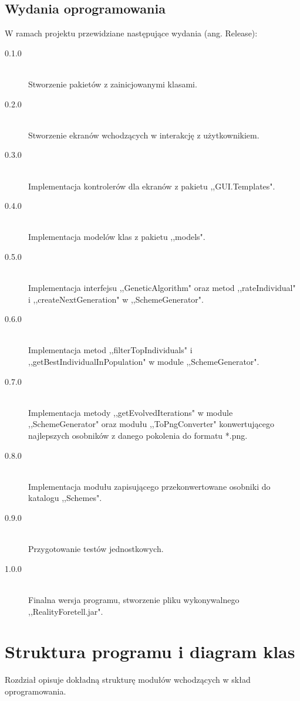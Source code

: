 \documentclass[10pt,oneside]{article}
\begin{document}
	\subsection{Wydania oprogramowania}
	W ramach projektu przewidziane następujące wydania (ang. Release):
	\begin{description}
		\item[0.1.0] \hfill \\Stworzenie pakietów z zainicjowanymi klasami.
		\item[0.2.0] \hfill \\Stworzenie ekranów wchodzących w interakcję z użytkownikiem.
		\item[0.3.0] \hfill \\Implementacja kontrolerów dla ekranów z pakietu ,,GUI.Templates".
		\item[0.4.0] \hfill \\Implementacja modelów klas z pakietu ,,models".
		\item[0.5.0] \hfill \\Implementacja interfejsu ,,GeneticAlgorithm" oraz metod ,,rateIndividual" i ,,createNextGeneration" w ,,SchemeGenerator".
		\item[0.6.0] \hfill \\Implementacja metod ,,filterTopIndividuals" i ,,getBestIndividualInPopulation" w module ,,SchemeGenerator".
		\item[0.7.0] \hfill \\Implementacja metody ,,getEvolvedIterations" w module ,,SchemeGenerator" oraz modułu ,,ToPngConverter" konwertującego najlepszych osobników z danego pokolenia do formatu *.png.
		\item[0.8.0] \hfill \\Implementacja modułu zapisującego przekonwertowane osobniki do katalogu ,,Schemes".
		\item[0.9.0] \hfill \\Przygotowanie testów jednostkowych.
		\item[1.0.0] \hfill \\Finalna wersja programu, stworzenie pliku wykonywalnego ,,RealityForetell.jar".
	\end{description}
	
	\FloatBarrier
	\section{Struktura programu i diagram klas}
	Rozdział opisuje dokładną strukturę modułów wchodzących w skład oprogramowania.
	
\end{document}
